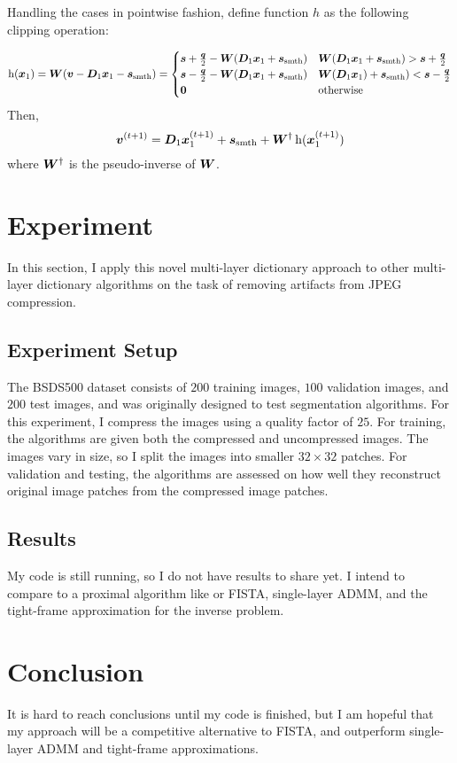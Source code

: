 Handling the cases in pointwise fashion, define function $h$ as the following clipping operation:

%
\begin{equation}
\operatorname{h}(\bm{x}_1) = \bm{W}(\bm{v} - \bm{D}_1\bm{x}_1 - \bm{s}_{\textrm{smth}}) = \begin{cases} \bm{s} + \frac{\bm{q}}{2} - \bm{W}(\bm{D}_1\bm{x}_1 + \bm{s}_{\textrm{smth}}) & \bm{W}(\bm{D}_1\bm{x}_1 + \bm{s}_{\textrm{smth}}) > \bm{s} + \frac{\bm{q}}{2} \\ \bm{s} - \frac{\bm{q}}{2} - \bm{W}(\bm{D}_1\bm{x}_1 + \bm{s}_{\textrm{smth}}) & \bm{W}(\bm{D}_1\bm{x}_1) + \bm{s}_{\textrm{smth}}) < \bm{s} - \frac{\bm{q}}{2} \\ \bm{0} & \text{otherwise}
\end{cases}
\end{equation}
%
Then,
\begin{equation}
\bm{v}^{(t + 1)} = \bm{D}_1\bm{x}_1^{(t + 1)} + \bm{s}_{\text{smth}} + \bm{W}^{\dagger}\operatorname{h}(\bm{x}_1^{(t + 1)})
\end{equation}
where $\bm{W}^{\dagger}$ is the pseudo-inverse of $\bm{W}$.


\section{Experiment}
In this section, I apply this novel multi-layer dictionary approach to other multi-layer dictionary algorithms on the task of removing artifacts from JPEG compression.
\subsection{Experiment Setup}
The BSDS500 dataset consists of $200$ training images, $100$ validation images, and $200$ test images, and was originally designed to test segmentation algorithms. For this experiment, I compress the images using a quality factor of $25$. For training, the algorithms are given both the compressed and uncompressed images. The images vary in size, so I split the images into smaller $32 \times 32$ patches. For validation and testing, the algorithms are assessed on how well they reconstruct original image patches from the compressed image patches.
\subsection{Results}
My code is still running, so I do not have results to share yet.  I intend to compare to a proximal algorithm like \cite{chodosh2020use} or FISTA, single-layer ADMM, and the tight-frame approximation for the inverse problem.
\section{Conclusion}
It is hard to reach conclusions until my code is finished, but I am hopeful that my approach will be a competitive alternative to FISTA, and outperform single-layer ADMM and tight-frame approximations.
